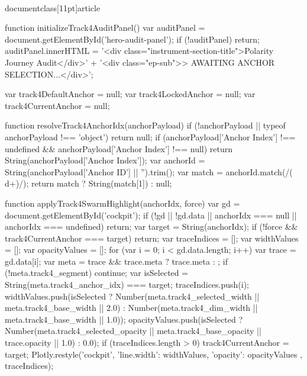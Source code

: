 \\documentclass[11pt]{article}
\begin{document}
\begin{CodeBlock}
{{{{{{        function initializeTrack4AuditPanel() {{
            var auditPanel = document.getElementById('hero-audit-panel');
            if (!auditPanel) return;
            auditPanel.innerHTML =
                '<div class="instrument-section-title">Polarity Journey Audit</div>' +
                '<div class="ep-sub">> AWAITING ANCHOR SELECTION...</div>';
        }}

        var track4DefaultAnchor = null;
        var track4LockedAnchor = null;
        var track4CurrentAnchor = null;

        function resolveTrack4AnchorIdx(anchorPayload) {{
            if (!anchorPayload || typeof anchorPayload !== 'object') return null;
            if (anchorPayload['Anchor Index'] !== undefined && anchorPayload['Anchor Index'] !== null) {{
                return String(anchorPayload['Anchor Index']);
            }}
            var anchorId = String(anchorPayload['Anchor ID'] || '').trim();
            var match = anchorId.match(/(\\d+)/);
            return match ? String(match[1]) : null;
        }}

        function applyTrack4SwarmHighlight(anchorIdx, force) {{
            var gd = document.getElementById('cockpit');
            if (!gd || !gd.data || anchorIdx === null || anchorIdx === undefined) return;
            var target = String(anchorIdx);
            if (!force && track4CurrentAnchor === target) return;
            var traceIndices = [];
            var widthValues = [];
            var opacityValues = [];
            for (var i = 0; i < gd.data.length; i++) {{
                var trace = gd.data[i];
                var meta = trace && trace.meta ? trace.meta : {{}};
                if (!meta.track4_segment) continue;
                var isSelected = String(meta.track4_anchor_idx) === target;
                traceIndices.push(i);
                widthValues.push(isSelected ? Number(meta.track4_selected_width || meta.track4_base_width || 2.0) : Number(meta.track4_dim_width || meta.track4_base_width || 1.0));
                opacityValues.push(isSelected ? Number(meta.track4_selected_opacity || meta.track4_base_opacity || trace.opacity || 1.0) : 0.0);
            }}
            if (traceIndices.length > 0) {{
                track4CurrentAnchor = target;
                Plotly.restyle('cockpit', {{
                    'line.width': widthValues,
                    'opacity': opacityValues
                }}, traceIndices);
            }}
        }}

}}}}}}
\end{CodeBlock}
\end{document}
